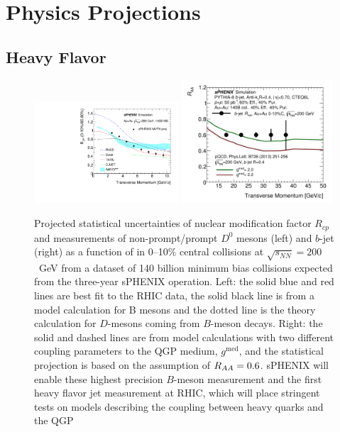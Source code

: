 \chapter{Physics Projections}
\label{chap:physics_projections}


\section{Heavy Flavor}
\label{sec:HF}


\begin{figure}[htbp]
\centering
\includegraphics[width=0.48\textwidth]{figs/Rcp_proj_140B_theory.pdf}
\includegraphics[width=0.5\textwidth]{figs/200pp_pythia8_CTEQ6L_7GeV_ALL_cfg_eneg_DSTReader_root_Draw_HFJetTruth_CrossSection2RAA_Theory_3yr_deta0_70.pdf}
\caption{Projected statistical uncertainties of nuclear modification factor $R_{cp}$ and \raa measurements of non-prompt/prompt $D^0$ mesons (left) and $b$-jet (right) as a function of \pT in 0--10\% central \auau collisions at $\sqrt{s_{NN}}=200$~GeV from a dataset of 140 billion minimum bias \auau collisions expected from the three-year sPHENIX operation. Left: the solid blue and red lines are best fit to the RHIC data, the solid black line is from a model calculation for B mesons and the dotted line is the theory calculation for $D$-mesons coming from $B$-meson decays. Right: the solid and dashed lines are from model calculations with two different coupling parameters to the QGP medium, $g^{\textrm{med}}$, and the statistical projection is based on the assumption of $\mbox{$R_{AA}$} =0.6$. sPHENIX will enable these highest precision $B$-meson measurement and the first heavy flavor jet measurement at RHIC, which will place stringent tests on models describing the coupling between heavy quarks and the QGP~\cite{Huang:2013vaa,Duke,TAMU,PHSD,CUJET}}
\label{fig:HF-inclusive-RAA}
\end{figure}

